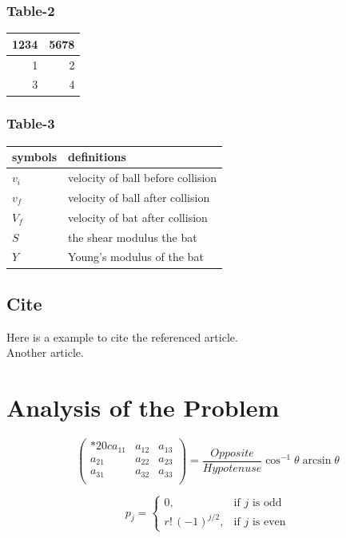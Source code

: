 \documentclass{mcmthesis}
\begin{document}
	\subsubsection{Table-2}
	\begin{tabular}{|r r|}
		\hline
		1234 & 5678 \\ \hline
		1 &  2 \\ \hline
		3 & 4 \\ \hline
	\end{tabular}
	
	\subsubsection{Table-3}
	\begin{tabular}{ll}
		\hline
		symbols&definitions\\
		\hline
		$v_i$& velocity of ball before collision\\
		$v_f$& velocity of ball after collision\\
		$V_f$& velocity of bat after collision\\
		$S$ & the shear modulus the bat\\
		$Y$ & Young’s modulus of the bat\\
		\hline
	\end{tabular}
	
	\subsection{Cite}
	Here is a example to cite the referenced article\cite{konishi:1999ab}. \\
	Another article\cite{refName}.
	
	
	\section{Analysis of the Problem}
	\[
	\begin{pmatrix}{*{20}c}
		{a_{11} } & {a_{12} } & {a_{13} }  \\
		{a_{21} } & {a_{22} } & {a_{23} }  \\
		{a_{31} } & {a_{32} } & {a_{33} }  \\
	\end{pmatrix}
	= \frac{{Opposite}}{{Hypotenuse}}\cos ^{ - 1} \theta \arcsin \theta
	\]
	\lipsum[9]
	
	\[
	p_{j}=\begin{cases} 0,&\text{if $j$ is odd}\\
		r!\,(-1)^{j/2},&\text{if $j$ is even}
	\end{cases}
	\]
	
\end{document}
